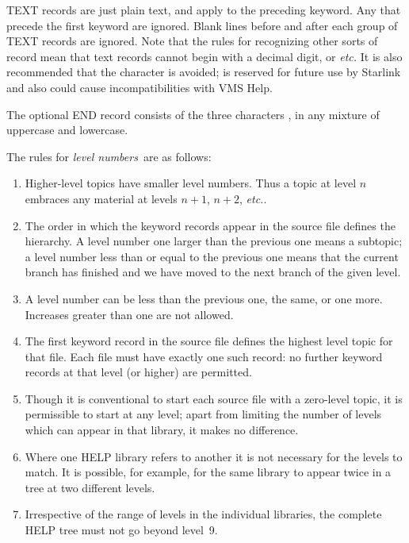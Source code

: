 TEXT records are just plain text, and apply to the preceding keyword.
Any that precede the first keyword are
ignored.  Blank lines before and after each group of TEXT records
are ignored.  Note that the rules for recognizing other sorts of
record mean that text records cannot begin with a decimal digit,
 or  {\it etc.}  It
is also recommended that the character \fstring{/} is avoided;
\fstring{/} is reserved for future use by Starlink and also could
cause incompatibilities with VMS Help.

The optional END record consists of the three characters , in
any mixture of uppercase and lowercase.

The rules for {\it level numbers}\, are as follows:
\begin{enumerate}
\item Higher-level topics have smaller level numbers.  Thus a topic at
level $n$ embraces any material at levels $n+1$, $n+2$, {\it etc.}.
\item The order in which the keyword records appear in the source file
defines the hierarchy.  A level number one larger than the previous
one means a subtopic; a level number less than or equal to the previous one
means that the current branch has finished and we have moved
to the next branch of the given level.
\item A level number can be less than the previous one, the same,
or one more.  Increases greater than one are not allowed.
\item The first keyword record in the source file defines the
highest level topic for that file.  Each file must have exactly
one such record:  no further keyword records at that level (or higher)
are permitted.
\item Though it is conventional to start each source file with a
zero-level topic, it is permissible to start at any level; apart
from limiting the number of levels which can appear in that
library, it makes no difference.
\item Where one HELP library refers to another it is not necessary for
the levels to match.  It is possible, for example, for the same
library to appear twice in a tree at two different levels.
\item Irrespective of the range of levels in the
individual libraries, the complete HELP tree must not go beyond
level~9.
\end{enumerate}


